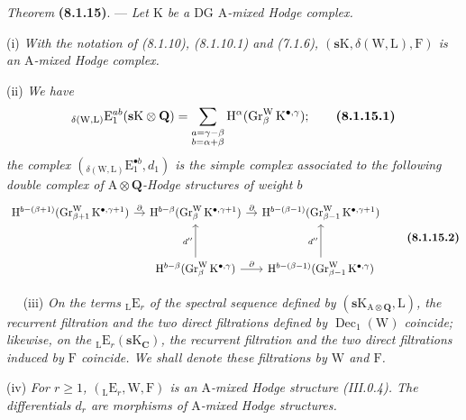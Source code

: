 \documentclass[11pt,leqno]{article}
\newcommand{\Page}[1]{\ifvmode\noindent\else\unskip\ \fi{\footnotesize\textcolor{gray}{[p.\,#1]}}\ \ignorespaces}
\begin{document}
\textit{Theorem} \textbf{(8.1.15)}. — \textit{Let \(\mathrm{K}\) be a \(\mathrm{DG}\) \(\mathrm{A}\)-mixed Hodge complex.}

(i) \textit{With the notation of (8.1.10), (8.1.10.1) and (7.1.6), \((\mathbf{s}\mathrm{K},\delta(\mathrm{W},\mathrm{L}),\mathrm{F})\) is an \(\mathrm{A}\)-mixed Hodge complex.}

(ii) \textit{We have}
\[
{}_{\delta(\mathrm{W},\mathrm{L})}\mathrm{E}_{1}^{ab}
(\mathbf{s}\mathrm{K}\otimes\mathbf{Q})
=
\sum_{\substack{a=\gamma-\beta\\b=\alpha+\beta}}
\mathrm{H}^{\alpha}
(\operatorname{Gr}_{\beta}^{\mathrm{W}}\mathrm{K}^{\bullet,\gamma});
\tag*{\textbf{(8.1.15.1)}}
\]
\textit{the complex \(({}_{\delta(\mathrm{W},\mathrm{L})}\mathrm{E}_{1}^{\bullet b},d_{1})\) is the simple complex associated to the following double complex of \(\mathrm{A}\otimes\mathbf{Q}\)-Hodge structures of weight \(b\)}
\[
\begin{tikzcd}[ampersand replacement=\&, column sep=1em, row sep=3em]
\mathrm{H}^{b-(\beta+1)}
(\operatorname{Gr}_{\beta+1}^{\mathrm{W}}\mathrm{K}^{\bullet,\gamma+1})
\arrow[r, "\partial"]
\&
\mathrm{H}^{b-\beta}
(\operatorname{Gr}_{\beta}^{\mathrm{W}}\mathrm{K}^{\bullet,\gamma+1})
\arrow[r, "\partial"]
\&
\mathrm{H}^{b-(\beta-1)}
(\operatorname{Gr}_{\beta-1}^{\mathrm{W}}\mathrm{K}^{\bullet,\gamma+1})
\\
\&
\mathrm{H}^{b-\beta}
(\operatorname{Gr}_{\beta}^{\mathrm{W}}\mathrm{K}^{\bullet,\gamma})
\arrow[u, "d''"]
\arrow[r, "\partial"]
\&
\mathrm{H}^{b-(\beta-1)}
(\operatorname{Gr}_{\beta-1}^{\mathrm{W}}\mathrm{K}^{\bullet,\gamma})
\arrow[u, "d''"]
\end{tikzcd}
\tag*{\textbf{(8.1.15.2)}}
\]

\Page{33}
(iii) \textit{On the terms \({}_{\mathrm{L}}\mathrm{E}_{r}\) of the spectral sequence defined by \((\mathbf{s}\mathrm{K}_{\mathrm{A}\otimes\mathbf{Q}},\mathrm{L})\), the recurrent filtration and the two direct filtrations defined by \(\operatorname{Dec}_{1}(\mathrm{W})\) coincide; likewise, on the \({}_{\mathrm{L}}\mathrm{E}_{r}(\mathbf{s}\mathrm{K}_{\mathbf{C}})\), the recurrent filtration and the two direct filtrations induced by \(\mathrm{F}\) coincide. We shall denote these filtrations by \(\mathrm{W}\) and \(\mathrm{F}\).}

(iv) \textit{For \(r\geq1\), \(({}_{\mathrm{L}}\mathrm{E}_{r},\mathrm{W},\mathrm{F})\) is an \(\mathrm{A}\)-mixed Hodge structure (III.0.4). The differentials \(d_{r}\) are morphisms of \(\mathrm{A}\)-mixed Hodge structures.}
\end{document}

